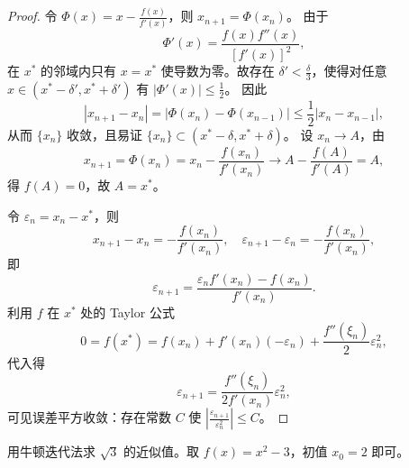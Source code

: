 \begin{proof}
令 $\Phi(x) = x - \frac{f(x)}{f'(x)}$，则 $x_{n+1} = \Phi(x_n)$。
由于
\[
\Phi'(x) = \frac{f(x)f''(x)}{[f'(x)]^2},
\]
在 $x^*$ 的邻域内只有 $x=x^*$ 使导数为零。故存在 $\delta'<\frac{\delta}{3}$，使得对任意 $x\in(x^*-\delta',x^*+\delta')$ 有 $|\Phi'(x)|\le \frac12$。
因此
\[
|x_{n+1}-x_n| = |\Phi(x_n)-\Phi(x_{n-1})| \le \frac12 |x_n-x_{n-1}|,
\]
从而 $\{x_n\}$ 收敛，且易证 $\{x_n\}\subset(x^*-\delta,x^*+\delta)$。
设 $x_n\to A$，由
\[
x_{n+1} = \Phi(x_n) = x_n - \frac{f(x_n)}{f'(x_n)} \to A - \frac{f(A)}{f'(A)} = A,
\]
得 $f(A)=0$，故 $A=x^*$。

令 $\varepsilon_n = x_n - x^*$，则
\[
x_{n+1}-x_n = -\frac{f(x_n)}{f'(x_n)},
\quad
\varepsilon_{n+1} - \varepsilon_n = -\frac{f(x_n)}{f'(x_n)},
\]
即
\[
\varepsilon_{n+1} = \frac{\varepsilon_n f'(x_n) - f(x_n)}{f'(x_n)}.
\]
利用 $f$ 在 $x^*$ 处的 Taylor 公式
\[
0 = f(x^*) = f(x_n) + f'(x_n)(-\varepsilon_n) + \frac{f''(\xi_n)}{2}\varepsilon_n^2,
\]
代入得
\[
\varepsilon_{n+1} = \frac{f''(\xi_n)}{2f'(x_n)}\varepsilon_n^2,
\]
可见误差平方收敛：存在常数 $C$ 使 $\left|\frac{\varepsilon_{n+1}}{\varepsilon_n^2}\right|\le C$。
\end{proof}

\begin{example}
用牛顿迭代法求 $\sqrt{3}$ 的近似值。取 $f(x)=x^2-3$，初值 $x_0=2$ 即可。
\end{example}

